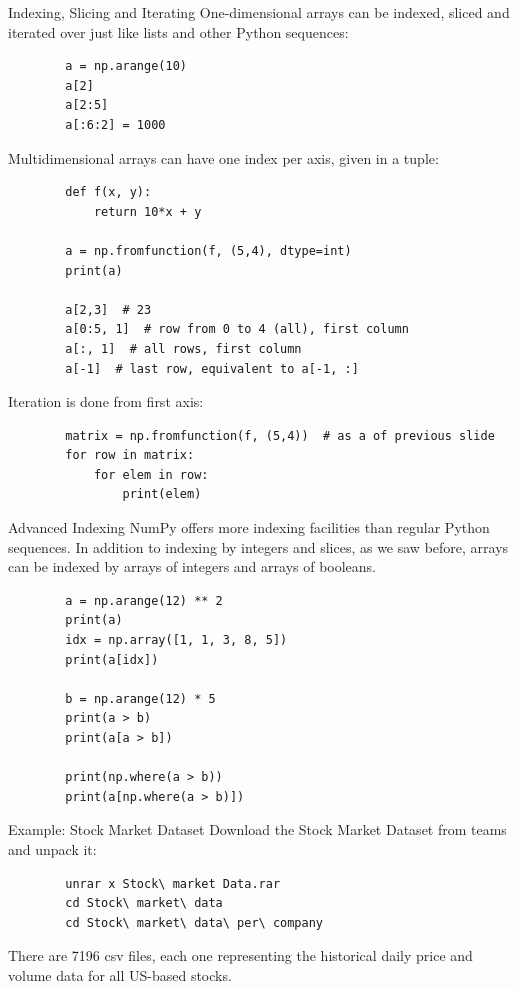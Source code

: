 \documentclass[aspectratio=169,]{beamer}
\begin{document}
\begin{frame}{Indexing, Slicing and Iterating}
    One-dimensional arrays can be indexed, sliced and iterated over just like lists and other Python sequences:
    \begin{verbatim}
        a = np.arange(10)
        a[2]
        a[2:5]
        a[:6:2] = 1000
    \end{verbatim}

    \framebreak
    Multidimensional arrays can have one index per axis, given in a tuple:
    \begin{verbatim}
        def f(x, y):
            return 10*x + y

        a = np.fromfunction(f, (5,4), dtype=int)
        print(a)

        a[2,3]  # 23
        a[0:5, 1]  # row from 0 to 4 (all), first column
        a[:, 1]  # all rows, first column
        a[-1]  # last row, equivalent to a[-1, :]
    \end{verbatim}

    \framebreak
    Iteration is done from first axis:
    \begin{verbatim}
        matrix = np.fromfunction(f, (5,4))  # as a of previous slide
        for row in matrix:
            for elem in row:
                print(elem)
    \end{verbatim}
\end{frame}

\begin{frame}[fragile]{Advanced Indexing}
NumPy offers more indexing facilities than regular Python sequences. In addition to indexing by integers and slices, as
    we saw before, arrays can be indexed by arrays of integers and arrays of booleans.
    \begin{verbatim}
        a = np.arange(12) ** 2
        print(a)
        idx = np.array([1, 1, 3, 8, 5])
        print(a[idx])

        b = np.arange(12) * 5
        print(a > b)
        print(a[a > b])

        print(np.where(a > b))
        print(a[np.where(a > b)])
    \end{verbatim}
\end{frame}

\begin{frame}[fragile]{Example: Stock Market Dataset}
    Download the Stock Market Dataset from teams and unpack it:
    \begin{verbatim}
        unrar x Stock\ market Data.rar
        cd Stock\ market\ data
        cd Stock\ market\ data\ per\ company
    \end{verbatim}
    There are 7196 csv files, each one representing the historical daily price and volume data for all US-based stocks.
\end{frame}
\end{document}
